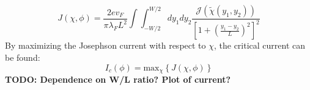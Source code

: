 \begin{equation}
J\left(\chi, \phi \right) = \frac{2 e v_F}{\pi \lambda_F L^2}  \int \int_{-W/2}^{W/2} d y_1 d y_2 \frac{\mathcal{J}(\tilde{\chi}(y_1, y_2))}{\left[ 1 + \left(\frac{y_1 - y_2}{L}\right)^2\right]^2}
\label{eq:josephson_current}
\end{equation}
By maximizing the Josephson current with respect to $\chi$, the critical current can be found:
\begin{equation}
I_c(\phi) = \text{max}_{\chi}\left\{ J(\chi, \phi) \right\}
\end{equation}
\textbf{TODO: Dependence on W/L ratio? Plot of current?}
